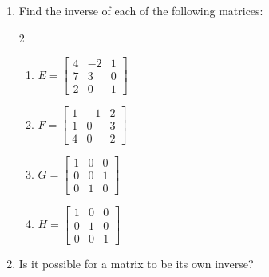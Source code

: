 \begin{enumerate}
\item[4.] Find the inverse of each of the following matrices:
\begin{multicols}{2}
\begin{enumerate}
\item [(a)] $E=\left[\begin{array}{rrr}4 & -2 & 1 \\ 7 & 3 & 0 \\ 2 & 0 & 1\end{array}\right]$
\item [(b)] $F=\left[\begin{array}{rrr}1 & -1 & 2 \\ 1 & 0 & 3 \\ 4 & 0 & 2\end{array}\right]$
\item [(c)] $G=\left[\begin{array}{lll}1 & 0 & 0 \\ 0 & 0 & 1 \\ 0 & 1 & 0\end{array}\right]$
\item [(d)] $H=\left[\begin{array}{lll}1 & 0 & 0 \\ 0 & 1 & 0 \\ 0 & 0 & 1\end{array}\right]$
\end{enumerate}
\end{multicols} 

\item[7.] Is it possible for a matrix to be its own inverse?
\end{enumerate}

